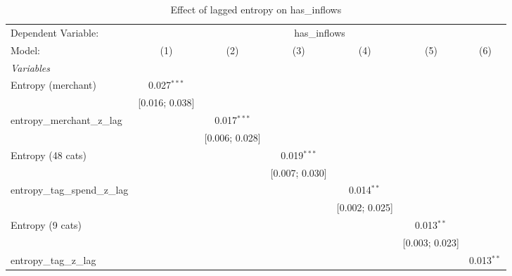 
\begin{table}[htbp]
   \centering
   \tiny
   \begin{threeparttable}[b]
      \caption{\label{tab:reg_has_inflows_lagged_z} Effect of lagged entropy on has\_inflows}
      \begin{tabular}{lcccccc}
         \tabularnewline \midrule \midrule
         Dependent Variable: & \multicolumn{6}{c}{has\_inflows}\\
         Model:                          & (1)            & (2)            & (3)            & (4)            & (5)            & (6)\\  
         \midrule
         \emph{Variables}\\
         Entropy (merchant)              & 0.027$^{***}$  &                &                &                &                &   \\   
                                         & [0.016; 0.038] &                &                &                &                &   \\   
         entropy\_merchant\_z\_lag       &                & 0.017$^{***}$  &                &                &                &   \\   
                                         &                & [0.006; 0.028] &                &                &                &   \\   
         Entropy (48 cats)               &                &                & 0.019$^{***}$  &                &                &   \\   
                                         &                &                & [0.007; 0.030] &                &                &   \\   
         entropy\_tag\_spend\_z\_lag     &                &                &                & 0.014$^{**}$   &                &   \\   
                                         &                &                &                & [0.002; 0.025] &                &   \\   
         Entropy (9 cats)                &                &                &                &                & 0.013$^{**}$   &   \\   
                                         &                &                &                &                & [0.003; 0.023] &   \\   
         entropy\_tag\_z\_lag            &                &                &                &                &                & 0.013$^{**}$\\   

\end{tabular}
\end{threeparttable}
\end{table}
